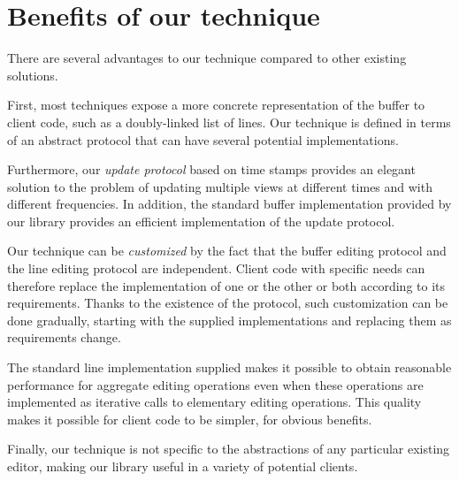 \section{Benefits of our technique}
 
There are several advantages to our technique compared to other
existing solutions.

First, most techniques expose a more concrete representation of the
buffer to client code, such as a doubly-linked list of lines.  Our
technique is defined in terms of an abstract \clos{} protocol that can
have several potential implementations.

Furthermore, our \emph{update protocol} based on time stamps provides
an elegant solution to the problem of updating multiple views at
different times and with different frequencies.  In addition, the
standard buffer implementation provided by our library provides an
efficient implementation of the update protocol.

Our technique can be \emph{customized} by the fact that the buffer
editing protocol and the line editing protocol are independent.
Client code with specific needs can therefore replace the
implementation of one or the other or both according to its
requirements.  Thanks to the existence of the \clos{} protocol, such
customization can be done gradually, starting with the supplied
implementations and replacing them as requirements change.

The standard line implementation supplied makes it possible to obtain
reasonable performance for aggregate editing operations even when
these operations are implemented as iterative calls to elementary
editing operations.  This quality makes it possible for client code to
be simpler, for obvious benefits.

Finally, our technique is not specific to the abstractions of any
particular existing editor, making our library useful in a variety of
potential clients.
